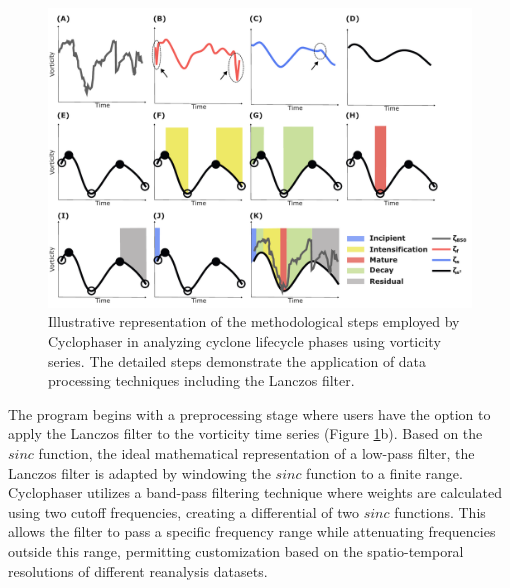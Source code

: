 \begin{figure}[h]
\centering
\includegraphics[width=\linewidth]{figs_3/cyclophaser_methodology.pdf}
\caption[Cyclophaser - methodological steps]{Illustrative representation of the methodological steps employed by Cyclophaser in analyzing cyclone lifecycle phases using vorticity series. The detailed steps demonstrate the application of data processing techniques including the Lanczos filter.}
\label{fig:/cyclophaser_methodology}
\end{figure}

The program begins with a preprocessing stage where users have the option to apply the Lanczos filter \citep{duchon1979lanczos} to the vorticity time series (Figure \ref{fig:/cyclophaser_methodology}b). Based on the $sinc$ function, the ideal mathematical representation of a low-pass filter, the Lanczos filter is adapted by windowing the $sinc$ function to a finite range. Cyclophaser utilizes a band-pass filtering technique where weights are calculated using two cutoff frequencies, creating a differential of two $sinc$ functions. This allows the filter to pass a specific frequency range while attenuating frequencies outside this range, permitting customization based on the spatio-temporal resolutions of different reanalysis datasets.

